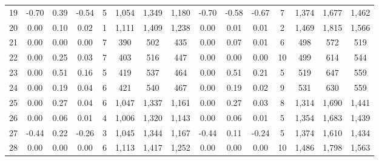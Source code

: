\documentclass[11pt]{article}
\begin{document}
\begin{table}[H]
\begin{tabular}{ccccccccccccccc}
\multicolumn{1}{c|}{19} & -0.70 & 0.39 & \multicolumn{1}{c|}{-0.54} & \multicolumn{1}{c|}{5} & 1,054 & 1,349 & \multicolumn{1}{c|}{1,180} & -0.70 & -0.58 & \multicolumn{1}{c|}{-0.67} & \multicolumn{1}{c|}{7} & 1,374 & 1,677 & 1,462 \\
\multicolumn{1}{c|}{20} & 0.00 & 0.10 & \multicolumn{1}{c|}{0.02} & \multicolumn{1}{c|}{1} & 1,111 & 1,409 & \multicolumn{1}{c|}{1,238} & 0.00 & 0.01 & \multicolumn{1}{c|}{0.01} & \multicolumn{1}{c|}{2} & 1,469 & 1,815 & 1,566 \\ \hline
\multicolumn{1}{c|}{21} & 0.00 & 0.00 & \multicolumn{1}{c|}{0.00} & \multicolumn{1}{c|}{7} & 390 & 502 & \multicolumn{1}{c|}{435} & 0.00 & 0.07 & \multicolumn{1}{c|}{0.01} & \multicolumn{1}{c|}{6} & 498 & 572 & 519 \\
\multicolumn{1}{c|}{22} & 0.00 & 0.25 & \multicolumn{1}{c|}{0.03} & \multicolumn{1}{c|}{7} & 403 & 516 & \multicolumn{1}{c|}{447} & 0.00 & 0.00 & \multicolumn{1}{c|}{0.00} & \multicolumn{1}{c|}{10} & 499 & 614 & 544 \\
\multicolumn{1}{c|}{23} & 0.00 & 0.51 & \multicolumn{1}{c|}{0.16} & \multicolumn{1}{c|}{5} & 419 & 537 & \multicolumn{1}{c|}{464} & 0.00 & 0.51 & \multicolumn{1}{c|}{0.21} & \multicolumn{1}{c|}{5} & 519 & 647 & 559 \\
\multicolumn{1}{c|}{24} & 0.00 & 0.19 & \multicolumn{1}{c|}{0.04} & \multicolumn{1}{c|}{6} & 421 & 540 & \multicolumn{1}{c|}{467} & 0.00 & 0.19 & \multicolumn{1}{c|}{0.02} & \multicolumn{1}{c|}{9} & 531 & 630 & 559 \\ \hline
\multicolumn{1}{c|}{25} & 0.00 & 0.27 & \multicolumn{1}{c|}{0.04} & \multicolumn{1}{c|}{6} & 1,047 & 1,337 & \multicolumn{1}{c|}{1,161} & 0.00 & 0.27 & \multicolumn{1}{c|}{0.03} & \multicolumn{1}{c|}{8} & 1,314 & 1,690 & 1,441 \\
\multicolumn{1}{c|}{26} & 0.00 & 0.06 & \multicolumn{1}{c|}{0.01} & \multicolumn{1}{c|}{4} & 1,006 & 1,320 & \multicolumn{1}{c|}{1,143} & 0.00 & 0.06 & \multicolumn{1}{c|}{0.01} & \multicolumn{1}{c|}{5} & 1,354 & 1,683 & 1,439 \\
\multicolumn{1}{c|}{27} & -0.44 & 0.22 & \multicolumn{1}{c|}{-0.26} & \multicolumn{1}{c|}{3} & 1,045 & 1,344 & \multicolumn{1}{c|}{1,167} & -0.44 & 0.11 & \multicolumn{1}{c|}{-0.24} & \multicolumn{1}{c|}{5} & 1,374 & 1,610 & 1,434 \\
\multicolumn{1}{c|}{28} & 0.00 & 0.00 & \multicolumn{1}{c|}{0.00} & \multicolumn{1}{c|}{6} & 1,113 & 1,417 & \multicolumn{1}{c|}{1,252} & 0.00 & 0.00 & \multicolumn{1}{c|}{0.00} & \multicolumn{1}{c|}{10} & 1,486 & 1,798 & 1,563 \\ \hline

\end{tabular}
\end{table}
\end{document}
